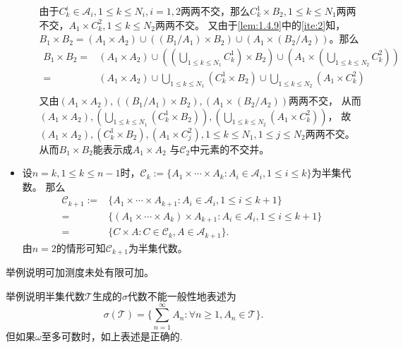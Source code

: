 \documentclass{ctexart}
\begin{document}
\begin{solution}
\begin{itemize}
\begin{itemize}
    由于\(C^i_k \in \mathcal{A}_i, 1 \leq k \leq N_i,i=1,2\)两两不交，那么\(C^1_k \times B_2, 1 \leq k \leq N_1\)两两不交，\(A_1 \times C^2_k,1 \leq k \leq N_2 \)两两不交。
    又由于\ref{lem:1.4.9}中的\ref{ite:2}知，
        \(B_1 \times B_2 = (A_1 \times A_2) \cup ((B_1 / A_1) \times B_2) \cup (A_1 \times (B_2 / A_2)) \)。那么
\[
 \begin{aligned}
   B_1 \times B_2 =& (A_1 \times A_2) \cup (( \bigcup_{1 \leq k \leq N_1} C^1_k )\times B_2 )\cup (A_1 \times (\bigcup_{1 \leq k \leq N_2} C^2_k))\\ 
   =&(A_1 \times A_2) \cup \bigcup_{1 \leq k \leq N_1} (C^1_k \times B_2) \cup \bigcup_{1 \leq k \leq N_2}(A_1 \times C^2_k)\\
 \end{aligned}
\]
又由\((A_1 \times A_2) , ((B_1 / A_1) \times B_2) , (A_1 \times (B_2 / A_2)) \)两两不交，
        从而\((A_1 \times A_2) , (\bigcup_{1 \leq k \leq N_1} (C^1_k \times B_2) ), ( \bigcup_{1 \leq k \leq N_2} (A_1 \times C^2_k)) \)，
        故\((A_1 \times A_2) , (C^1_k \times B_2 ), (A_1 \times C^2_j), 1 \leq  k \leq N_1, 1 \leq j \leq N_2 \)两两不交。
        从而\(B_1 \times B_2 \)能表示成\(A_1 \times A_2 \) 与\(\mathcal{C}_2 \)中元素的不交并。
    \end{itemize}
  \item 设\(n=k, 1 \leq k \leq n-1\)时，\(\mathcal{C}_k:=\{A_1 \times \cdots \times A_k:A_i \in \mathcal{A}_i, 1 \leq i \leq k\} \)为半集代数。
    那么\[
      \begin{aligned}
        \mathcal{C}_{k + 1}:=&\{A_1 \times \cdots \times A_{k + 1}: A_i \in \mathcal{A}_i, 1 \leq i \leq k + 1\}\\
        =&\{(A_1 \times \cdots \times A_k)\times A_{k + 1}: A_i \in \mathcal{A}_i, 1 \leq i \leq k + 1\} \\ 
        =&\{C \times A: C \in \mathcal{C}_k ,A \in \mathcal{A}_{k + 1}\}.
      \end{aligned}
    \]
    由\(n=2 \)的情形可知\(\mathcal{C}_{k + 1} \)为半集代数。
\end{itemize}
\end{solution}

\begin{problem}\label{pro:1.4.11}
  举例说明可加测度未处有限可加。
\end{problem}
\begin{problem}
  举例说明半集代数\(\mathcal{T}\)生成的\(\sigma\)代数不能一般性地表述为
  \[
    \sigma(\mathcal{T})=\{\sum_{n=1}^{\infty} A_n:\forall n \geq 1, A_n \in \mathcal{T}\}.
  \]
  但如果\(\omega\)至多可数时，如上表述是正确的.
\end{problem}
\begin{solution}
  
\end{solution}
\end{document}
